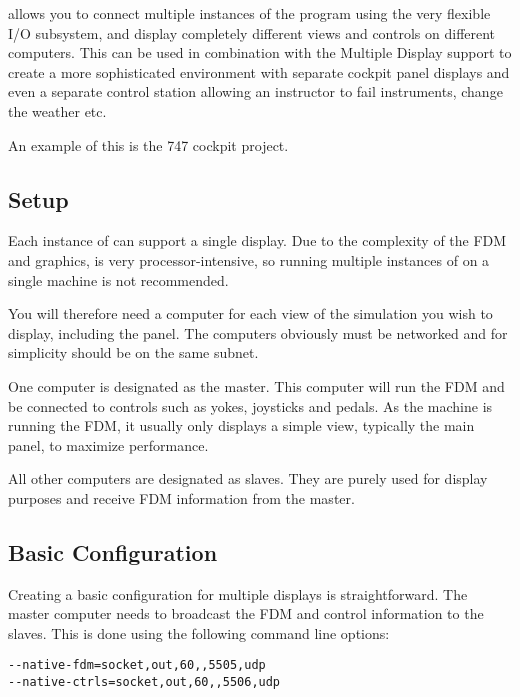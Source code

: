 \begin{enumerate}
\FlightGear{} allows you to connect multiple instances of the program
using the very flexible I/O subsystem, and display completely different views
 and controls on different computers. This can be used in combination
 with the Multiple Display support to create a more sophisticated environment
 with separate cockpit panel displays and even a separate control
station allowing an instructor to fail instruments, change the weather etc.

An example of this is the 747 cockpit project.

\noindent
{}

\subsection{Setup}

Each instance of \FlightGear{} can support a single display. Due to the
complexity of the FDM and graphics, \FlightGear{} is very processor-intensive,
so running multiple instances of \FlightGear{} on a single machine is not
recommended.

You will therefore need a computer for each view of the simulation you wish
to display, including the panel. The computers obviously must be networked
and for simplicity should be on the same subnet.

One computer is designated as the master. This computer will run the FDM and
be connected to controls such as yokes, joysticks and pedals. As the machine is
running the FDM, it usually only displays a simple view, typically the main
panel, to maximize performance.

All other computers are designated as slaves. They are purely used for display
purposes and receive FDM information from the master.

\subsection{Basic Configuration}

Creating a basic configuration for multiple displays is straightforward. The
master computer needs to broadcast the FDM and control information to the slaves.
This is done using the following command line options:

\begin{verbatim}
--native-fdm=socket,out,60,,5505,udp
--native-ctrls=socket,out,60,,5506,udp
\end{verbatim}


\end{enumerate}
